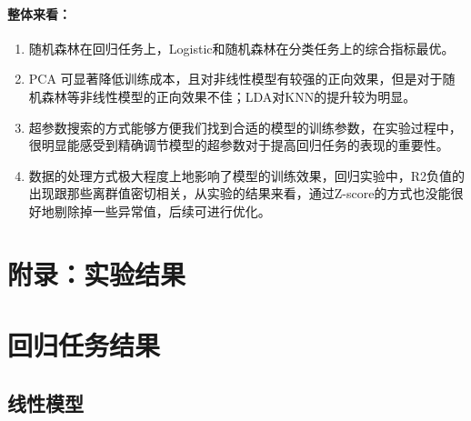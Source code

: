 \documentclass[10pt]{article}
\begin{document}
\paragraph{整体来看：}
\begin{enumerate}
  \item 随机森林在回归任务上，Logistic和随机森林在分类任务上的综合指标最优。
  \item PCA 可显著降低训练成本，且对非线性模型有较强的正向效果，但是对于随机森林等非线性模型的正向效果不佳；LDA对KNN的提升较为明显。
  \item 超参数搜索的方式能够方便我们找到合适的模型的训练参数，在实验过程中，很明显能感受到精确调节模型的超参数对于提高回归任务的表现的重要性。
  \item 数据的处理方式极大程度上地影响了模型的训练效果，回归实验中，R2负值的出现跟那些离群值密切相关，从实验的结果来看，通过Z-score的方式也没能很好地剔除掉一些异常值，后续可进行优化。
\end{enumerate}





\newpage
\appendix
\section*{附录：实验结果}
\section{回归任务结果}
\subsection{线性模型}
\end{document}
